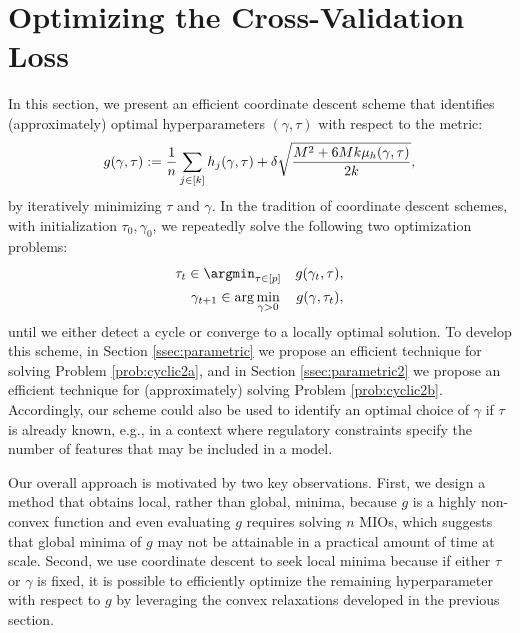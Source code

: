 \documentclass[mnsc,nonblindrev]{informs3} %
\begin{document}
\section{Optimizing the Cross-Validation Loss}\label{sec:corddescent}
In this section, we present an efficient coordinate descent scheme that identifies (approximately) optimal hyperparameters $(\gamma, \tau)$ with respect to the metric: 
\begin{equation}\label{prob:cyclic1}\color{black}
	g(\gamma, \tau):= \frac{1}{n} \sum_{j \in [k]} h_j(\gamma, \tau)+\delta \sqrt{\frac{M^2+6 M k \mu_h(\gamma, \tau)}{2 k}},\\[0.2em]
\end{equation}
by iteratively minimizing $\tau$ and $\gamma$. In the tradition of coordinate descent schemes, with initialization $\tau_0, \gamma_0$, we repeatedly solve the following two optimization problems:
\begin{align}\label{prob:cyclic2a}
    \tau_t \in \argmin_{\tau \in[p]} \quad g(\gamma_t, \tau),\\
    \gamma_{t+1} \in \arg \min_{\gamma >0 } \quad g(\gamma, \tau_t),\label{prob:cyclic2b}
\end{align}
until we either detect a cycle or converge to a locally optimal solution. To develop this scheme, in Section \ref{ssec:parametric} we propose an efficient technique for solving Problem {\color{black}\eqref{prob:cyclic2a}}, %
and in Section \ref{ssec:parametric2} we propose an efficient technique for (approximately) solving Problem {\color{black}\eqref{prob:cyclic2b}}. Accordingly, our scheme could also be used to identify an optimal choice of $\gamma$ if $\tau$ is already known, e.g., in a context where regulatory constraints specify the number of features that may be included in a model. 

Our overall approach is motivated by two key observations. First, we design a method that obtains local, rather than global, minima, because $g$ is a highly non-convex function and even evaluating $g$ requires solving $n$ MIOs, which suggests that global minima of $g$ may not be attainable in a practical amount of time at scale. Second, we use coordinate descent to seek local minima because if either $\tau$ or $\gamma$ is fixed, it is possible to efficiently optimize the remaining hyperparameter with respect to $g$ by leveraging the convex relaxations developed in the previous section. %
\end{document}
